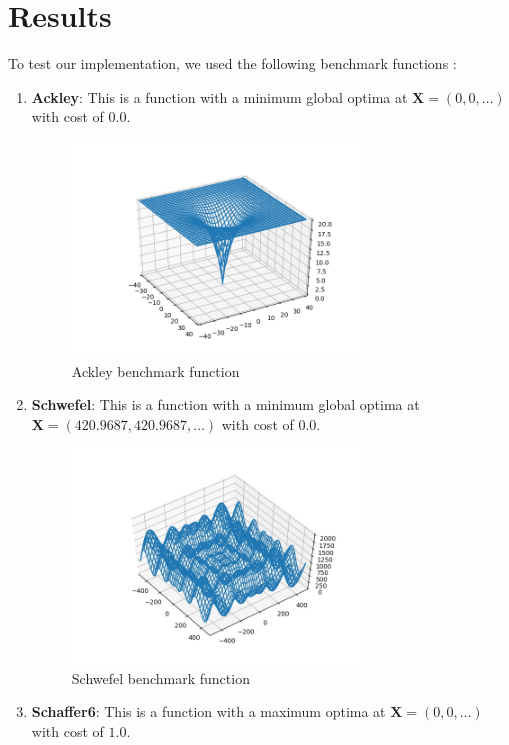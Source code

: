 \documentclass[journal]{IEEEtran}
\begin{document}
\section{Results}

To test our implementation, we used the following benchmark functions :

\begin{enumerate}
    \item \textbf{Ackley}: This is a function with a minimum global optima at $\textbf{X} = (0,0,\hdots)$ with cost of $0.0$.

    \begin{figure}[H]
    \centering
    \includegraphics[width=3.0in]{_img/img_bmfunction_ackley.png}
    \caption{Ackley benchmark function}
    \end{figure}

    \item \textbf{Schwefel}: This is a function with a minimum global optima at $\textbf{X} = (420.9687,420.9687    ,\hdots)$ with cost of $0.0$.

    \begin{figure}[H]
    \centering
    \includegraphics[width=3.0in]{_img/img_bmfunction_schwefel.jpeg}
    \caption{Schwefel benchmark function}
    \end{figure}

    \item \textbf{Schaffer6}: This is a function with a maximum optima at $\textbf{X} = (0,0,\hdots)$ with cost of $1.0$.


\end{enumerate}
\end{document}
